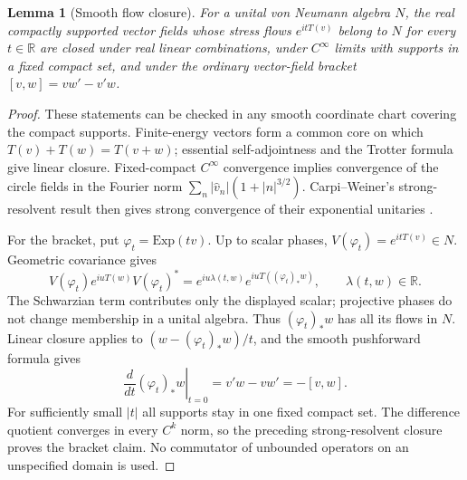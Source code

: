 \documentclass[12pt]{article}
\newtheorem{lemma}[theorem]{Lemma}
\theoremstyle{definition}
\theoremstyle{remark}
\begin{document}
\begin{lemma}[Smooth flow closure]\label{lem:flowclosure}
For a unital von Neumann algebra \(N\), the real compactly supported vector
fields whose stress flows \(e^{itT(v)}\) belong to \(N\) for every \(t\in\mathbb R\)
are closed under real linear combinations, under \(C^\infty\) limits with
supports in a fixed compact set, and under the ordinary vector-field bracket
\([v,w]=vw'-v'w\).
\end{lemma}
\begin{proof}
These statements can be checked in any smooth coordinate chart covering the
compact supports. Finite-energy vectors form a common core on which
\(T(v)+T(w)=T(v+w)\); essential self-adjointness and the Trotter formula give
linear closure. Fixed-compact \(C^\infty\) convergence implies convergence of
the circle fields in the Fourier norm
\(\sum_n|\hat v_n|(1+|n|^{3/2})\). Carpi--Weiner's strong-resolvent result then
gives strong convergence of their exponential unitaries
\cite[Thm.~4.4, Prop.~4.5]{CW}.

For the bracket, put \(\varphi_t=\mathrm{Exp}(tv)\). Up to scalar phases,
\(V(\varphi_t)=e^{itT(v)}\in N\). Geometric covariance gives
\[
 V(\varphi_t)e^{iuT(w)}V(\varphi_t)^*
   =e^{iu\lambda(t,w)}e^{iuT((\varphi_t)_*w)},\qquad \lambda(t,w)\in\mathbb R .
\]
The Schwarzian term contributes only the displayed scalar; projective phases
do not change membership in a unital algebra. Thus
\((\varphi_t)_*w\) has all its flows in \(N\). Linear closure applies to
\((w-(\varphi_t)_*w)/t\), and the smooth pushforward formula gives
\[
 \left.\frac{d}{dt}(\varphi_t)_*w\right|_{t=0}
       =v'w-vw'=-[v,w].
\]
For sufficiently small \(|t|\) all supports stay in one fixed compact set.
The difference quotient converges in every \(C^k\) norm, so the preceding
strong-resolvent closure proves the bracket claim. No commutator of unbounded
operators on an unspecified domain is used.
\end{proof}
\end{document}

